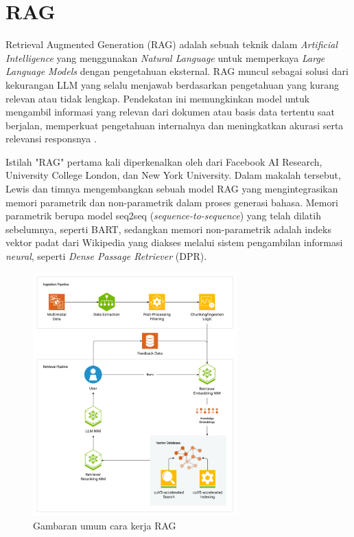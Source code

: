 \section{RAG}
\label{sec:rag}

Retrieval Augmented Generation (RAG) adalah sebuah teknik dalam \textit{Artificial Intelligence} yang menggunakan \textit{Natural Language} untuk memperkaya \textit{Large Language Models} dengan pengetahuan eksternal. RAG muncul sebagai solusi dari kekurangan LLM yang selalu menjawab berdasarkan pengetahuan yang kurang relevan atau tidak lengkap. Pendekatan ini memungkinkan model untuk mengambil informasi yang relevan dari dokumen atau basis data tertentu saat berjalan, memperkuat pengetahuan internalnya dan meningkatkan akurasi serta relevansi responsnya \parencite{merritt2025rag}.

Istilah "RAG" pertama kali diperkenalkan oleh \cite{lewis2020retrieval} dari Facebook AI Research, University College London, dan New York University. Dalam makalah tersebut, Lewis dan timnya mengembangkan sebuah model RAG yang mengintegrasikan memori parametrik dan non-parametrik dalam proses generasi bahasa. Memori parametrik berupa model seq2seq (\textit{sequence-to-sequence}) yang telah dilatih sebelumnya, seperti BART, sedangkan memori non-parametrik adalah indeks vektor padat dari Wikipedia yang diakses melalui sistem pengambilan informasi \textit{neural}, seperti \textit{Dense Passage Retriever} (DPR).

\begin{figure}[ht]
	\centering
	\includegraphics[width=0.7\textwidth]{resources/chapter-2/rag-overview.png}
	\caption{Gambaran umum cara kerja RAG \parencite{merritt2025rag}}
	\label{image:rag-overview}
\end{figure}


